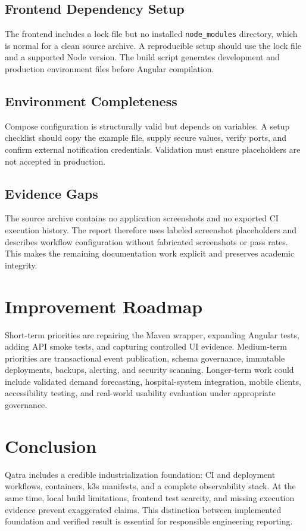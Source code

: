 \subsection{Frontend Dependency Setup}
The frontend includes a lock file but no installed \texttt{node\_modules} directory, which is normal for a clean source archive. A reproducible setup should use the lock file and a supported Node version. The build script generates development and production environment files before Angular compilation.

\subsection{Environment Completeness}
Compose configuration is structurally valid but depends on variables. A setup checklist should copy the example file, supply secure values, verify ports, and confirm external notification credentials. Validation must ensure placeholders are not accepted in production.

\subsection{Evidence Gaps}
The source archive contains no application screenshots and no exported CI execution history. The report therefore uses labeled screenshot placeholders and describes workflow configuration without fabricated screenshots or pass rates. This makes the remaining documentation work explicit and preserves academic integrity.

\section{Improvement Roadmap}
Short-term priorities are repairing the Maven wrapper, expanding Angular tests, adding API smoke tests, and capturing controlled UI evidence. Medium-term priorities are transactional event publication, schema governance, immutable deployments, backups, alerting, and security scanning. Longer-term work could include validated demand forecasting, hospital-system integration, mobile clients, accessibility testing, and real-world usability evaluation under appropriate governance.

\section*{Conclusion}
Qatra includes a credible industrialization foundation: CI and deployment workflows, containers, k3s manifests, and a complete observability stack. At the same time, local build limitations, frontend test scarcity, and missing execution evidence prevent exaggerated claims. This distinction between implemented foundation and verified result is essential for responsible engineering reporting.
